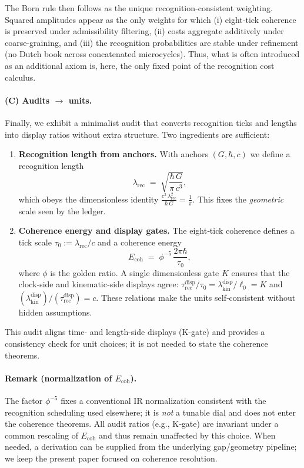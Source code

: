 \documentclass[12pt,a4paper]{article}
\theoremstyle{definition}
\theoremstyle{remark}
\begin{document}
The Born rule then follows as the unique recognition‑consistent weighting. Squared amplitudes appear as the only weights for which (i) eight‑tick coherence is preserved under admissibility filtering, (ii) costs aggregate additively under coarse‑graining, and (iii) the recognition probabilities are stable under refinement (no Dutch book across concatenated microcycles). Thus, what is often introduced as an additional axiom is, here, the only fixed point of the recognition cost calculus.

\paragraph{(C) Audits $\to$ units.}
Finally, we exhibit a minimalist audit that converts recognition ticks and lengths into display ratios without extra structure. Two ingredients are sufficient:
\begin{enumerate}
  \item \textbf{Recognition length from anchors.} With anchors $(G,\hbar,c)$ we define a recognition length
  \[
    \lambda_{\mathrm{rec}}
      \;=\; \sqrt{\frac{\hbar\,G}{\pi\,c^3}},
  \]
  which obeys the dimensionless identity
  \(
    \displaystyle \frac{c^3\,\lambda_{\mathrm{rec}}^2}{\hbar\,G} = \frac{1}{\pi}.
  \)
  This fixes the \emph{geometric} scale seen by the ledger.
  \item \textbf{Coherence energy and display gates.} The eight‑tick coherence defines a tick scale $\tau_0 := \lambda_{\mathrm{rec}}/c$ and a coherence energy
  \[
    E_{\mathrm{coh}} \;=\; \phi^{-5}\,\frac{2\pi\hbar}{\tau_0},
  \]
  where $\phi$ is the golden ratio. A single dimensionless gate $K$ ensures that the clock‑side and kinematic‑side displays agree: $\tau_{\mathrm{rec}}^{\mathrm{disp}}/ \tau_0 = \lambda_{\mathrm{kin}}^{\mathrm{disp}}/\ell_0 = K$ and $(\lambda_{\mathrm{kin}}^{\mathrm{disp}})/(\tau_{\mathrm{rec}}^{\mathrm{disp}})=c$. These relations make the units self‑consistent without hidden assumptions.
\end{enumerate}
This audit aligns time- and length-side displays (K-gate) and provides a consistency check for unit choices; it is not needed to state the coherence theorems.

\paragraph{Remark (normalization of $E_{\mathrm{coh}}$).}
The factor $\phi^{-5}$ fixes a conventional IR normalization consistent with the recognition scheduling used elsewhere; it is \emph{not} a tunable dial and does not enter the coherence theorems. All audit ratios (e.g., K‑gate) are invariant under a common rescaling of $E_{\mathrm{coh}}$ and thus remain unaffected by this choice. When needed, a derivation can be supplied from the underlying gap/geometry pipeline; we keep the present paper focused on coherence resolution.
\end{document}

